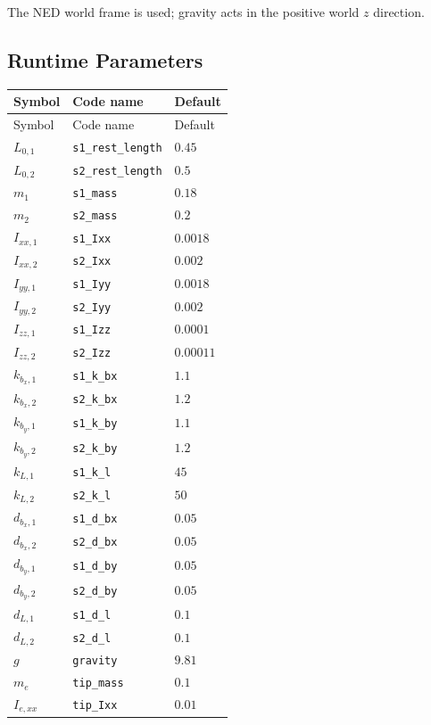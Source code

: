 \documentclass[11pt]{article}
\begin{document}
The NED world frame is used; gravity acts in the positive world $z$ direction.
\subsection{Runtime Parameters}
\begin{longtable}{lll}
\hline
Symbol & Code name & Default \\
\hline
\endfirsthead
\hline Symbol & Code name & Default \\
\hline
\endhead
$L_{0,1}$ & \texttt{s1\_rest\_length} & $0.45$ \\
$L_{0,2}$ & \texttt{s2\_rest\_length} & $0.5$ \\
$m_{1}$ & \texttt{s1\_mass} & $0.18$ \\
$m_{2}$ & \texttt{s2\_mass} & $0.2$ \\
$I_{xx,1}$ & \texttt{s1\_Ixx} & $0.0018$ \\
$I_{xx,2}$ & \texttt{s2\_Ixx} & $0.002$ \\
$I_{yy,1}$ & \texttt{s1\_Iyy} & $0.0018$ \\
$I_{yy,2}$ & \texttt{s2\_Iyy} & $0.002$ \\
$I_{zz,1}$ & \texttt{s1\_Izz} & $0.0001$ \\
$I_{zz,2}$ & \texttt{s2\_Izz} & $0.00011$ \\
$k_{b_x,1}$ & \texttt{s1\_k\_bx} & $1.1$ \\
$k_{b_x,2}$ & \texttt{s2\_k\_bx} & $1.2$ \\
$k_{b_y,1}$ & \texttt{s1\_k\_by} & $1.1$ \\
$k_{b_y,2}$ & \texttt{s2\_k\_by} & $1.2$ \\
$k_{L,1}$ & \texttt{s1\_k\_l} & $45$ \\
$k_{L,2}$ & \texttt{s2\_k\_l} & $50$ \\
$d_{b_x,1}$ & \texttt{s1\_d\_bx} & $0.05$ \\
$d_{b_x,2}$ & \texttt{s2\_d\_bx} & $0.05$ \\
$d_{b_y,1}$ & \texttt{s1\_d\_by} & $0.05$ \\
$d_{b_y,2}$ & \texttt{s2\_d\_by} & $0.05$ \\
$d_{L,1}$ & \texttt{s1\_d\_l} & $0.1$ \\
$d_{L,2}$ & \texttt{s2\_d\_l} & $0.1$ \\
$g$ & \texttt{gravity} & $9.81$ \\
$m_e$ & \texttt{tip\_mass} & $0.1$ \\
$I_{e,xx}$ & \texttt{tip\_Ixx} & $0.01$ \\

\end{longtable}
\end{document}
